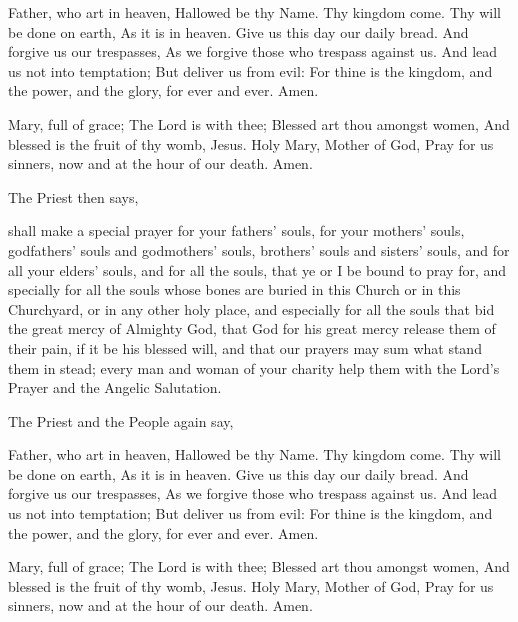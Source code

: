  Father, who art in heaven, Hallowed be thy Name. Thy kingdom come. Thy will be done on earth, As it is in heaven. Give us this day our daily bread. And forgive us our trespasses, As we forgive those who trespass against us. And lead us not into temptation; But deliver us from evil: For thine is the kingdom, and the power, and the glory, for ever and ever. Amen.
\par\noindent
{} Mary, full of grace; The Lord is with thee; Blessed art thou amongst women, And blessed is the fruit of thy womb, Jesus. Holy Mary, Mother of God, Pray for us sinners, now and at the hour of our death. Amen.
\begin{rubric}
    The Priest then says,
\end{rubric}
 shall make a special prayer for your fathers' souls, for your mothers' souls, godfathers' souls and godmothers' souls, brothers' souls and sisters' souls, and for all your elders' souls, and for all the souls, that ye or I be bound to pray for, and specially for all the souls whose bones are buried in this Church or in this Churchyard, or in any other holy place, and especially for all the souls that bid the great mercy of Almighty God, that God for his great mercy release them of their pain, if it be his blessed will, and that our prayers may sum what stand them in stead; every man and woman of your charity help them with the Lord's Prayer and the Angelic Salutation.
\begin{rubric}
    The Priest and the People again say,
\end{rubric}
 Father, who art in heaven, Hallowed be thy Name. Thy kingdom come. Thy will be done on earth, As it is in heaven. Give us this day our daily bread. And forgive us our trespasses, As we forgive those who trespass against us. And lead us not into temptation; But deliver us from evil: For thine is the kingdom, and the power, and the glory, for ever and ever. Amen.
\par\noindent
{} Mary, full of grace; The Lord is with thee; Blessed art thou amongst women, And blessed is the fruit of thy womb, Jesus. Holy Mary, Mother of God, Pray for us sinners, now and at the hour of our death. Amen.


